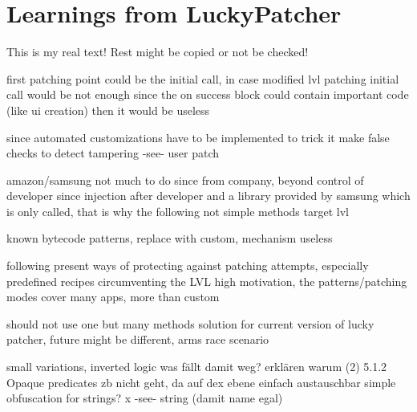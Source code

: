 \section{Learnings from LuckyPatcher}\label{section:luckypatcher-learnings}
This is my real text! Rest might be copied or not be checked!

%
first patching point could be the initial call, in case modified lvl patching initial call would be not enough since the on success block could contain important code (like ui creation) then it would be useless

since automated customizations have to be implemented to trick it
make false checks to detect tampering -see- user patch

amazon/samsung not much to do since from company, beyond control of developer since injection after developer and a library provided by samsung which is only called, that is why the following not simple methods target lvl

known bytecode patterns, replace with custom, mechanism useless

following present ways of protecting against patching attempts, especially predefined recipes circumventing the LVL
high motivation, the patterns/patching modes cover many apps, more than custom

should not use one but many methods
solution for current version of lucky patcher, future might be different, arms race scenario


small variations, inverted logic
\cite{munteanLicense}
%
was fällt damit weg?\newline
erklären warum 	(2) 5.1.2 Opaque predicates zb nicht geht, da auf dex ebene einfach austauschbar\newline
simple obfuscation for strings? x -see- string (damit name egal)

